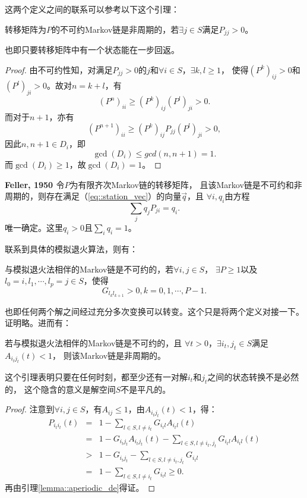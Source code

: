 这两个定义之间的联系可以参考以下这个引理：

\begin{lemma}{}
  转移矩阵为$P$的不可约Markov链是非周期的，若$\exists j \in S$满足$P_{jj} > 0$。
  \label{lemma::aperiodic_de}
\end{lemma}
也即只要转移矩阵中有一个状态能在一步回返。

\begin{proof}
  由不可约性知，对满足$P_{jj} > 0$的$j$和$\forall i \in S$，$\exists k, l \geq 1$，
  使得$(P^k)_{ij} > 0$和$(P^l)_{ji} > 0$。故对$n = k + l$，有
  $$
  (P^n)_{ii} \geq (P^k)_{ij}(P^l)_{ji} > 0.
  $$
  而对于$n + 1$，亦有
  $$
  (P^{n + 1})_{ii} \geq (P^k)_{ij}P_{jj}(P^l)_{ji} > 0,
  $$
  因此$n ,n + 1 \in D_i$，即
  $$
  \gcd(D_i) \leq gcd(n, n + 1) = 1.
  $$
  而$\gcd(D_i) \geq 1$，故$\gcd(D_i) = 1$。
\end{proof}

\begin{theorem}{\bf Feller, 1950 \cite{Feller1950An}} 令$P$为有限齐次Markov链的转移矩阵，
  且该Markov链是不可约和非周期的，则存在满足（\ref{eq::station_vec}）的向量$\vec{q}$，且
  $\forall i, q_i$由方程
  \begin{equation}
    \sum_jq_jP_{ji} = q_i.
  \end{equation}
  唯一确定。这里$q_i > 0$且$\sum_i q_i = 1$。
\end{theorem}


联系到具体的模拟退火算法，则有：

\begin{lemma}{} 与模拟退火法相伴的Markov链是不可约的，若$\forall i, j \in S$，
  $\exists P \geq 1$以及$l_0 = i, l_1, \cdots, l_p = j \in S$，使得
  \begin{equation}
    G_{l_kl_{k + 1}} > 0, k = 0, 1, \cdots, P - 1.
  \end{equation}
\end{lemma}
也即任何两个解之间经过充分多次变换可以转变。这个只是将两个定义对接一下。证明略。进而有：

\begin{lemma}{} 若与模拟退火法相伴的Markov链是不可约的，且
  $\forall t > 0$，$\exists i_t, j_t \in S$满足$A_{i_tj_t}(t) < 1$，
  则该Markov链是非周期的。
\end{lemma}
这个引理表明只要在任何时刻，都至少还有一对解$i_t$和$j_t$之间的状态转换不是必然的，
这个隐含的意义是解空间$S$不是平凡的。

\begin{proof}
  注意到$\forall i, j \in S$，有$A_{ij} \leq 1$，由$A_{i_tj_t}(t) < 1$，得：
  \begin{eqnarray*}
    P_{i_ti_t}(t) & = & 1 - \sum_{l \in S, l \neq i_t} G_{i_tl}A_{i_tl}(t) \\
    & = & 1 - G_{i_tj_t}A_{i_tj_t}(t) - \sum_{l \in S, l \neq i_t, j_t} G_{i_tl}A_{i_tl}(t) \\
    & > & 1 - G_{i_tj_t} - \sum_{l \in S, l \neq i_t, j_t}G_{i_tl} \\
    & = & 1 - \sum_{l \in S, l \neq i_t} G_{i_tl} \geq 0.
  \end{eqnarray*}
  再由引理\ref{lemma::aperiodic_de}得证。
\end{proof}

